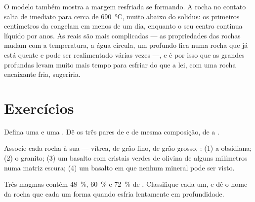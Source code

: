 O modelo também mostra a margem resfriada se formando. A rocha no contato
salta de imediato para cerca de \qty{690}{\degreeCelsius}, muito abaixo do
solidus: os primeiros centímetros da  congelam em menos de um dia,
enquanto o seu centro continua líquido por anos. As  reais são mais
complicadas --- as propriedades das rochas mudam com a temperatura, a água
circula, um  profundo fica numa rocha que já está quente e pode ser
realimentado várias vezes ---, e é por isso que as grandes 
profundas levam muito mais tempo para esfriar do que a lei, com uma rocha
encaixante fria, sugeriria.

\section{Exercícios}

\begin{exercise}[$\star$]\label{exo:g11:igneous-rocks:1}
Defina uma  e uma . Dê os três pares de  e  de mesma composição, de  a .
\end{exercise}

\begin{exercise}[$\star$]\label{exo:g11:igneous-rocks:2}
Associe cada rocha à sua  --- vítrea, de grão fino, de grão grosso,
: (1) a obsidiana; (2) o granito; (3) um basalto com cristais
verdes de olivina de alguns milímetros numa matriz escura; (4) um basalto em
que nenhum mineral pode ser visto.
\end{exercise}

\begin{exercise}[$\star$]\label{exo:g11:igneous-rocks:3}
Três magmas contêm \qty{48}{\percent}, \qty{60}{\percent} e
\qty{72}{\percent} de . Classifique cada um, e dê o nome da rocha
que cada um forma quando esfria lentamente em profundidade.
\end{exercise}

